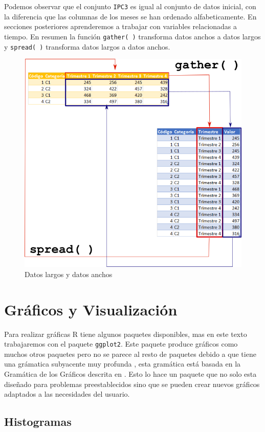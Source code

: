 \documentclass[
]{krantz}
\begin{document}
Podemos observar que el conjunto \texttt{IPC3} es igual al conjunto de datos inicial, con la diferencia que las columnas de los meses se han ordenado alfabeticamente. En secciones posteriores aprenderemos a trabajar con variables relacionadas a tiempo. En resumen la función \texttt{gather(\ )} transforma datos anchos a datos largos y \texttt{spread(\ )} transforma datos largos a datos anchos.

\begin{figure}[!h]

{\centering \includegraphics[width=0.5\linewidth]{gat_spr} 

}

\caption{Datos largos y datos anchos}\label{fig:gatspr}
\end{figure}

\newpage

\hypertarget{graficos-y-visualizacion}{%
\section{Gráficos y Visualización}\label{graficos-y-visualizacion}}

Para realizar gráficas R tiene algunos paquetes disponibles, mas en este texto trabajaremos con el paquete \texttt{ggplot2}. Este paquete produce gráficos como muchos otros paquetes pero no se parece al resto de paquetes debido a que tiene una grámatica subyacente muy profunda \citep{wickham2016}, esta gramática está basada en la Gramática de los Gráficos descrita en \citet{wilkinson2005}. Esto lo hace un paquete que no solo esta diseñado para problemas preestablecidos sino que se pueden crear nuevos gráficos adaptados a las necesidades del usuario.

\hypertarget{histogramas}{%
\subsection{Histogramas}\label{histogramas}}
\end{document}
